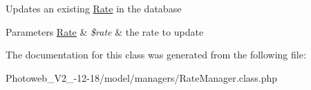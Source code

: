 Updates an existing \hyperlink{classRate}{Rate} in the database 
\begin{DoxyParams}[1]{Parameters}
\hyperlink{classRate}{Rate} & {\em \$rate} & the rate to update \\
\hline
\end{DoxyParams}


The documentation for this class was generated from the following file\+:\begin{DoxyCompactItemize}
\item 
Photoweb\+\_\+\+V2\+\_-\/12-\/18/model/managers/Rate\+Manager.\+class.\+php\end{DoxyCompactItemize}
